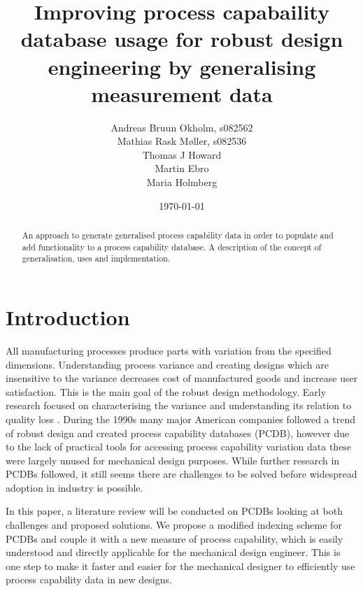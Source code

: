\documentclass[aip,amsmath, reprint, author-year]{revtex4-1}
\begin{document}
\begin{abstract}
An approach to generate generalised process capability data in order to populate and add functionality to a process capability database.
A description of the concept of generalisation, uses and implementation.
\end{abstract}

\title{Improving process capabaility database usage for robust design engineering by generalising measurement data}
\author{Andreas Bruun Okholm, s082562\\
Mathias Rask Møller, s082536\\
Thomas J Howard\\
Martin Ebro\\
Maria Holmberg}
 
\date{\today}
\maketitle


\section{Introduction}

All manufacturing processes produce parts with variation from the specified dimensions. Understanding process variance and creating designs which are insensitive to the variance decreases cost of manufactured goods and increase user satisfaction. 
This is the main goal of the robust design methodology.
Early research focused on characterising the variance and understanding its relation to quality loss \cite{taguchi1986introduction}. 
During the 1990s many major American companies followed a trend of robust design and created process capability databases (PCDB), however due to the lack of practical tools for accessing process capability variation data these were largely unused for mechanical design purposes\cite{tata1999process}. 
While further research in PCDBs followed, it still seems there are challenges to be solved before widespread adoption in industry is possible.

In this paper, a literature review will be conducted on PCDBs looking at both challenges and proposed solutions. 
We propose a modified indexing scheme for PCDBs and couple it with a new measure of process capability, which is easily understood and directly applicable for the mechanical design engineer. 
This is one step to make it faster and easier for the mechanical designer to efficiently use process capability data in new designs. 
\end{document}
